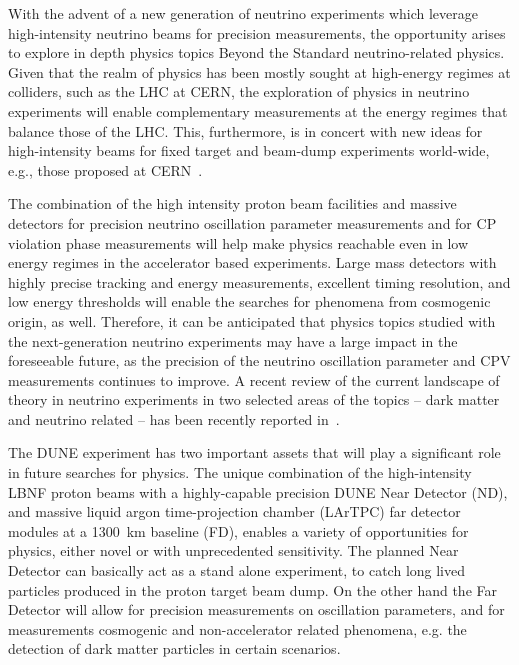 
With the advent of a new generation of neutrino experiments which leverage high-intensity neutrino beams for precision measurements, 
the opportunity arises to explore in depth physics topics Beyond the Standard neutrino-related physics. 
Given that the realm of  physics  has been mostly sought at high-energy regimes at colliders, 
such as the LHC at CERN, the exploration of  physics in neutrino experiments will enable complementary 
measurements at the energy regimes that balance those  of the LHC. 
This, furthermore, is  in concert with new ideas for high-intensity beams for fixed target and beam-dump experiments 
world-wide, e.g., those proposed at CERN~\cite{Beacham:2019nyx}.

The combination of the high intensity proton beam facilities and massive detectors for precision neutrino oscillation parameter measurements and for CP violation phase measurements will help make  physics reachable even in low energy regimes in the accelerator based experiments.
Large mass detectors with highly precise tracking and energy measurements, excellent timing resolution, and low energy thresholds will enable the searches for  phenomena from cosmogenic origin, as well.
Therefore, it can be anticipated that  physics topics studied with the next-generation neutrino 
experiments may have a large impact in the foreseeable future, 
as the precision of the neutrino oscillation parameter and CPV measurements continues to improve.
A recent review of the current landscape of  theory in neutrino experiments in two selected areas of the  topics -- dark matter and neutrino related  -- has been recently reported in~\cite{Arguelles:2019xgp}.

The DUNE experiment has two important assets that will play a significant role in 
future searches for  physics.
The unique combination of the high-intensity LBNF proton beams with a highly-capable precision
 DUNE Near Detector (ND), and massive liquid argon time-projection chamber (LArTPC) far detector modules at a \SI{1300}{\km} baseline (FD), enables a variety of opportunities for  physics, either novel or with unprecedented sensitivity.
The planned Near Detector can basically act as a stand alone experiment,
to catch long lived particles produced in the proton target beam dump. On the other hand the Far Detector 
will allow for precision measurements on oscillation parameters, and for measurements cosmogenic and
 non-accelerator related phenomena, e.g. the detection of dark matter particles in certain scenarios.

